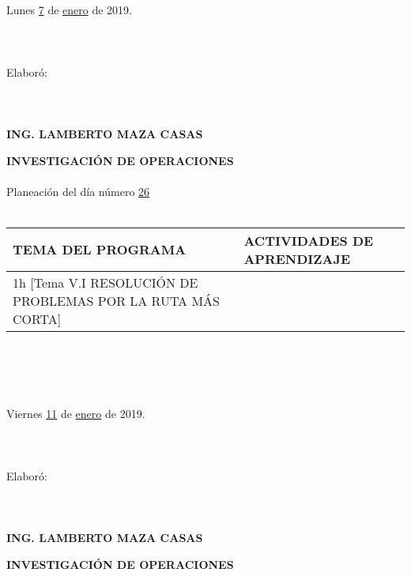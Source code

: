 \documentclass[landscape]{article}
\begin{document}
{\begin{center}
\ \\
\ \\
Lunes \underline{\hspace{0.5cm}7\hspace{0.5cm}} de  \underline{\hspace{0.5cm}enero\hspace{0.5cm}} de 2019.
\ \\
\ \\
\ \\
\ \\
Elabor\'o:
\ \\
\ \\
\ \\
\ \\
{\bf ING. LAMBERTO MAZA CASAS}
\end{center}
\eject
\begin{center}
{\bf 
INVESTIGACI\'ON DE OPERACIONES
}
\ \\
\ \\
Planeaci\'on del d\'ia n\'umero \underline{\hspace{0.5cm}26\hspace{0.5cm}}
\ \\
\ \\
\begin{tabular}{|p{11cm}|p{8cm}|}\hline
{\bf TEMA DEL PROGRAMA}&{\bf ACTIVIDADES DE APRENDIZAJE}\\\hline
	1h	[Tema V.I RESOLUCI\'ON DE PROBLEMAS POR LA RUTA M\'AS CORTA]
&\\
\hline
\end{tabular}
\ \\
\ \\
\ \\
\ \\
Viernes \underline{\hspace{0.5cm}11\hspace{0.5cm}} de  \underline{\hspace{0.5cm}enero\hspace{0.5cm}} de 2019.
\ \\
\ \\
\ \\
\ \\
Elabor\'o:
\ \\
\ \\
\ \\
\ \\
{\bf ING. LAMBERTO MAZA CASAS}
\end{center}
\eject
\begin{center}
{\bf 
INVESTIGACI\'ON DE OPERACIONES
}
\end{center}}
\end{document}
